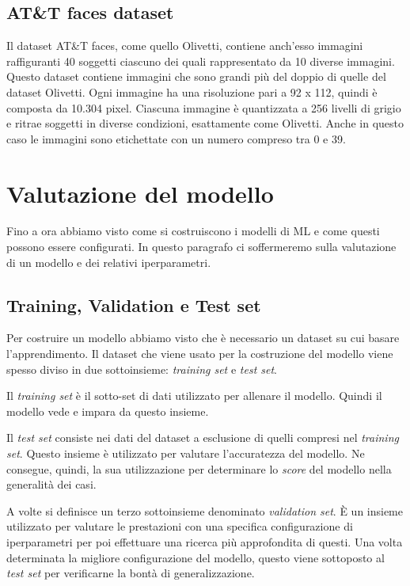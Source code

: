 \documentclass[12pt,italian]{report}
\begin{document}
\subsection{AT\&T faces dataset}
Il dataset AT\&T faces, come quello Olivetti, contiene anch'esso immagini raffiguranti 40 soggetti ciascuno dei quali rappresentato da 10 diverse immagini. Questo dataset contiene immagini che sono grandi più del doppio di quelle del dataset Olivetti. Ogni immagine ha una risoluzione pari a 92 x 112, quindi è composta da 10.304 pixel. Ciascuna immagine è quantizzata a 256 livelli di grigio e ritrae soggetti in diverse condizioni, esattamente come Olivetti. Anche in questo caso le immagini sono etichettate con un numero compreso tra 0 e 39.

\section{Valutazione del modello}
Fino a ora abbiamo visto come si costruiscono i modelli di ML e come questi possono essere configurati. In questo paragrafo ci soffermeremo sulla valutazione di un modello e dei relativi iperparametri.

\subsection{Training, Validation e Test set}
Per costruire un modello abbiamo visto che è necessario un dataset su cui basare l'apprendimento. Il dataset che viene usato per la costruzione del modello viene spesso diviso in due sottoinsieme: \emph{training set} e \emph{test set}.

Il \emph{training set} è il sotto-set di dati utilizzato per allenare il modello. Quindi il modello vede e impara da questo insieme.

Il \emph{test set} consiste nei dati del dataset a esclusione di quelli compresi nel \emph{training set}. Questo insieme è utilizzato per valutare l'accuratezza del modello. 
Ne consegue, quindi, la sua utilizzazione per determinare lo \emph{score} del modello nella generalità dei casi.

A volte si definisce un terzo sottoinsieme denominato \emph{validation set}. È un insieme utilizzato per valutare le prestazioni con una specifica configurazione di iperparametri per poi effettuare una ricerca più approfondita di questi. 
Una volta determinata la migliore configurazione del modello, questo viene sottoposto al \emph{test set} per verificarne la bontà di generalizzazione.
\end{document}

